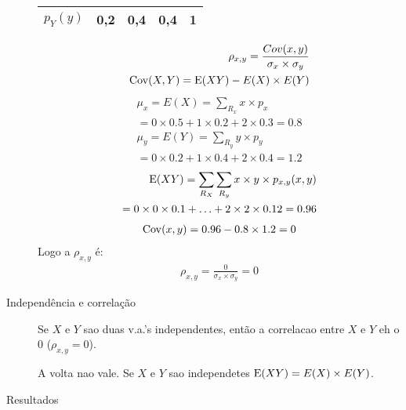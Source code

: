 \begin{description}
\begin{example}
\begin{table}[H]
\begin{tabular}{c c c c c}
          $p_{Y} (y)$ & 0,2 & 0,4 &0,4 & 1 \\ \bottomrule
        \end{tabular}
      \end{table}
      \begin{align*}
        \rho_{x,y} = \frac{Cov(x,y)}{\sigma_{x} \times \sigma_{y}}\\
        \operatorname{Cov}(X,Y)=\operatorname{E}(XY)-E(X) \times E(Y)
      \end{align*}
      \begin{align*}
        \mu_{x} =E(X)=\sum \limits_{R_{x}}x \times p_{x} \\
        = 0 \times 0.5 + 1 \times 0.2 + 2 \times 0.3 = 0.8
      \end{align*}
      \begin{align*}
        \mu_{y} =E(Y)=\sum \limits_{R_{y}}y \times p_{y} \\
        = 0 \times 0.2 + 1 \times 0.4 + 2 \times 0.4 = 1.2 
      \end{align*}
      \begin{align*}
        \operatorname{E}(XY) = \sum \limits_{R_{X}} \sum \limits_{R_{y}} x\times y \times p_{x,y}(x,y) \\
        = 0 \times 0 \times 0.1 + \ldots + 2 \times 2 \times 0.12 = 0.96
      \end{align*}
      \begin{align*}
        \operatorname{Cov}(x,y) = 0.96 - 0.8 \times 1.2     =0
      \end{align*}
      Logo a $\rho_{x,y}$ é:
      \begin{align*}
        \rho_{x,y}  = \frac{0}{\sigma_{x} \times \sigma_{y}}=0 
      \end{align*}
    \end{example}

    \item[Independência e correlação]  Se $X$ e $Y$ sao duas v.a.'s independentes, então a correlacao entre $X$ e $Y$ eh o $0$ ($\rho_{x,y}=0$).
      \begin{obs}A volta nao vale. Se $X$ e $Y$ sao independetes $\operatorname{E}(XY)=E(X) \times E(Y)$.
    \end{obs}
  \item [Resultados]\hfill
    

\end{description}
